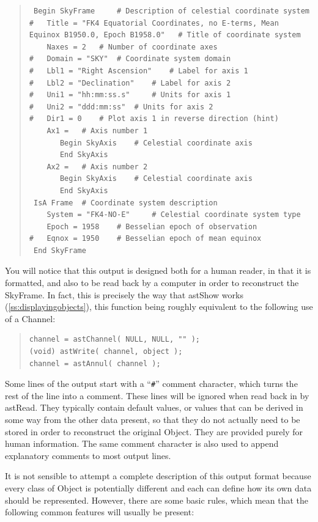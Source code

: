 \documentclass[twoside,11pt]{article}
\newcommand{\htmlref}[2]{#1}
\newcommand{\secref}[1]{\S\ref{#1}}
\renewcommand{\secref}[1]{\ref{#1}}
\begin{document}
\begin{quote}
\small
\begin{verbatim}
 Begin SkyFrame 	# Description of celestial coordinate system
#   Title = "FK4 Equatorial Coordinates, no E-terms, Mean Equinox B1950.0, Epoch B1958.0" 	# Title of coordinate system
    Naxes = 2 	# Number of coordinate axes
#   Domain = "SKY" 	# Coordinate system domain
#   Lbl1 = "Right Ascension" 	# Label for axis 1
#   Lbl2 = "Declination" 	# Label for axis 2
#   Uni1 = "hh:mm:ss.s" 	# Units for axis 1
#   Uni2 = "ddd:mm:ss" 	# Units for axis 2
#   Dir1 = 0 	# Plot axis 1 in reverse direction (hint)
    Ax1 = 	# Axis number 1
       Begin SkyAxis 	# Celestial coordinate axis
       End SkyAxis
    Ax2 = 	# Axis number 2
       Begin SkyAxis 	# Celestial coordinate axis
       End SkyAxis
 IsA Frame 	# Coordinate system description
    System = "FK4-NO-E" 	# Celestial coordinate system type
    Epoch = 1958 	# Besselian epoch of observation
#   Eqnox = 1950 	# Besselian epoch of mean equinox
 End SkyFrame
\end{verbatim}
\normalsize
\end{quote}

You will notice that this output is designed both for a human reader,
in that it is formatted, and also to be read back by a computer in
order to reconstruct the SkyFrame. In fact, this is precisely the way
that \htmlref{astShow}{astShow} works (\secref{ss:displayingobjects}), this function being
roughly equivalent to the following use of a Channel:

\begin{quote}
\small
\begin{verbatim}
channel = astChannel( NULL, NULL, "" );
(void) astWrite( channel, object );
channel = astAnnul( channel );
\end{verbatim}
\normalsize
\end{quote}

Some lines of the output start with a ``\verb?#?'' comment character,
which turns the rest of the line into a comment. These lines will be
ignored when read back in by \htmlref{astRead}{astRead}.  They typically contain default
values, or values that can be derived in some way from the other data
present, so that they do not actually need to be stored in order to
reconstruct the original Object. They are provided purely for human
information. The same comment character is also used to append
explanatory comments to most output lines.

It is not sensible to attempt a complete description of this output
format because every class of Object is potentially different and each
can define how its own data should be represented. However, there are
some basic rules, which mean that the following common features will
usually be present:
\end{document}
